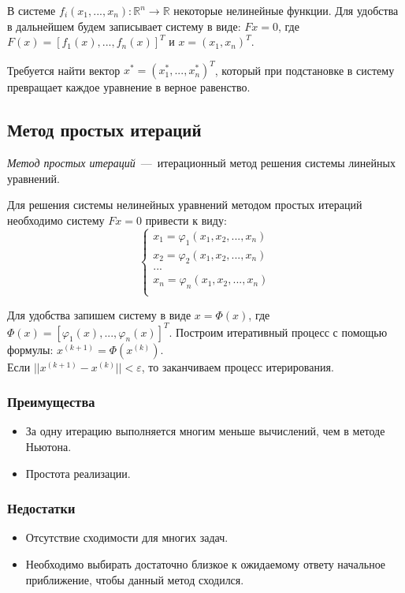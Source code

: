 \documentclass[12pt,a4paper,oneside]{extarticle}
\begin{document}
    В системе $f_i(x_1, ..., x_n) \colon \mathbb{R}^n \to \mathbb{R}$ некоторые нелинейные функции. Для удобства в дальнейшем будем записывает систему в виде: $Fx=0$, где $F(x) = [f_1(x), ...,f_n(x)]^T$ и $x=(x_1, x_n)^T$.

    Требуется найти вектор $x^*=(x_1^*, ..., x_n^*)^T$, который при подстановке в систему превращает каждое уравнение в верное равенство.

    \subsection{Метод простых итераций}
        {\it Метод простых итераций}~---~итерационный метод решения системы линейных уравнений.

        Для решения системы нелинейных уравнений методом простых итераций необходимо систему $Fx=0$ привести к виду:
        \begin{equation*}
            \begin{cases}
                x_1 = \varphi_1(x_1, x_2, ..., x_n) \\
                x_2 = \varphi_2(x_1, x_2, ..., x_n) \\
                ... \\
                x_n = \varphi_n(x_1, x_2, ..., x_n) \\
            \end{cases}
        \end{equation*}

        Для удобства запишем систему в виде $x=\Phi(x)$, где $\Phi(x) = [\varphi_1(x), ...,\varphi_n(x)]^T$. Построим итеративный процесс с помощью формулы: $x^{(k+1)}=\Phi(x^{(k)})$. \\Если $||x^{(k+1)}-x^{(k)}||<\varepsilon$, то заканчиваем процесс итерирования. 
    

        \subsubsection{Преимущества}
            \begin{itemize}
                \item За одну итерацию выполняется многим меньше вычислений, чем в методе Ньютона.
                \item Простота реализации.
            \end{itemize}
        \subsubsection{Недостатки}
            \begin{itemize}
                \item Отсутствие сходимости для многих задач.
                \item Необходимо выбирать достаточно близкое к ожидаемому ответу начальное приближение, чтобы данный метод сходился.
            \end{itemize}
\end{document}
